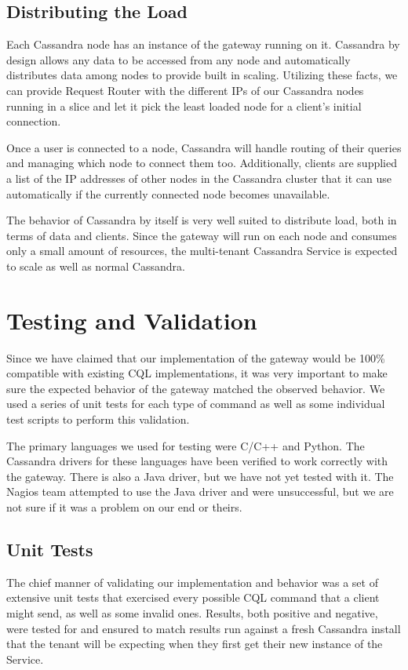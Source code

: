 \documentclass[11pt,notitlepage]{report}
\begin{document}
\section*{Distributing the Load}

Each Cassandra node has an instance of the gateway running on it. Cassandra by design allows any data to be accessed from any node and automatically distributes data among nodes to provide built in scaling. Utilizing these facts, we can provide Request Router with the different IPs of our Cassandra nodes running in a slice and let it pick the least loaded node for a client's initial connection.

Once a user is connected to a node, Cassandra will handle routing of their queries and managing which node to connect them too. Additionally, clients are supplied a list of the IP addresses of other nodes in the Cassandra cluster that it can use automatically if the currently connected node becomes unavailable.

The behavior of Cassandra by itself is very well suited to distribute load, both in terms of data and clients. Since the gateway will run on each node and consumes only a small amount of resources, the multi-tenant Cassandra Service is expected to scale as well as normal Cassandra.


\chapter*{Testing and Validation}

Since we have claimed that our implementation of the gateway would be 100\% compatible with existing CQL implementations, it was very important to make sure the expected behavior of the gateway matched the observed behavior. We used a series of unit tests for each type of command as well as some individual test scripts to perform this validation.

The primary languages we used for testing were C/C++ and Python. The Cassandra drivers for these languages have been verified to work correctly with the gateway. There is also a Java driver, but we have not yet tested with it. The Nagios team attempted to use the Java driver and were unsuccessful, but we are not sure if it was a problem on our end or theirs.


\section*{Unit Tests}
The chief manner of validating our implementation and behavior was a set of extensive unit tests that exercised every possible CQL command that a client might send, as well as some invalid ones. Results, both positive and negative, were tested for and ensured to match results run against a fresh Cassandra install that the tenant will be expecting when they first get their new instance of the Service.
\end{document}

